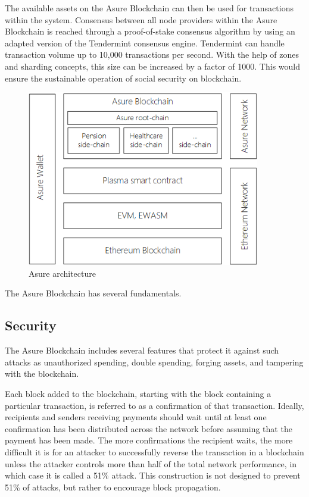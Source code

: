 The available assets on the Asure Blockchain can then be used for transactions within the system. Consensus between all node providers within the Asure Blockchain is reached through a proof-of-stake consensus algorithm by using an adapted version of the Tendermint consensus engine. \cite{tendermint} Tendermint can handle transaction volume up to 10,000 transactions per second. With the help of zones and sharding concepts, this size can be increased by a factor of 1000. This would ensure the sustainable operation of social security on blockchain. \cite{tendermint_bench}

\begin{figure}[H]
    \centering
    \includegraphics[width=4.0in]{img/architecture.png}
    \caption{Asure architecture}
    \label{fig:asure_architecture}
\end{figure}

The Asure Blockchain has several fundamentals. 

\subsection{Security}
The Asure Blockchain includes several features that protect it against such attacks as unauthorized spending, double spending, forging assets, and tampering with the blockchain. 

Each block added to the blockchain, starting with the block containing a particular transaction, is referred to as a confirmation of that transaction. Ideally, recipients and senders receiving payments should wait until at least one confirmation has been distributed across the network before assuming that the payment has been made. The more confirmations the recipient waits, the more difficult it is for an attacker to successfully reverse the transaction in a blockchain unless the attacker controls more than half of the total network performance, in which case it is called a 51\% attack. This construction is not designed to prevent 51\% of attacks, but rather to encourage block propagation. 

